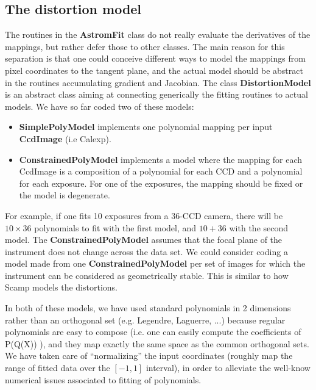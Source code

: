 \documentclass[a4paper,12pt]{scrartcl}
\newcommand{\ClName}[1]{{\bf #1}}
\def\bf{\normalfont\bfseries}
\begin{document}
\subsection{The distortion model}
The routines in the \ClName{AstromFit} class do not really evaluate
the derivatives of the mappings, but rather defer those to other classes.
The main reason for this separation is that one could conceive
different ways to model the mappings from pixel coordinates to
the tangent plane, and the actual model should be abstract
in the routines accumulating gradient and Jacobian. The class
\ClName{DistortionModel} is an abstract class aiming at
connecting generically the fitting routines to actual models.
We have so far coded two of these models:
\begin{itemize} 
\item \ClName{SimplePolyModel} implements 
one polynomial mapping per input \ClName{CcdImage} (i.e Calexp).
\item \ClName{ConstrainedPolyModel} implements a model
where the mapping for each CcdImage is a composition of a polynomial
for each CCD and a polynomial for each exposure. For one of the exposures,
the mapping should be fixed or the model is degenerate.
\end{itemize}
For example, if one fits 10 exposures from a 36-CCD camera,
there will be $10\times 36$ polynomials to fit with the first model, and
$10+36$ with the second model. The  \ClName{ConstrainedPolyModel}
assumes that the focal plane of the instrument does not change
across the data set. We could consider coding a model 
made from one \ClName{ConstrainedPolyModel} per set of images
for which the instrument can be considered as geometrically stable.
This is similar to how Scamp models the distortions.

In both of these models, we have used standard polynomials in 2
dimensions rather than an orthogonal set (e.g. Legendre, Laguerre,
...)  because regular polynomials are easy to compose (i.e. one can
easily compute the coefficients of P(Q(X)) ), and they map exactly the
same space as the common orthogonal sets. We have taken care of
``normalizing'' the input coordinates (roughly map the range of fitted
data over the $[-1,1]$ interval), in order to alleviate the well-know
numerical issues associated to fitting of polynomials.
\end{document}

